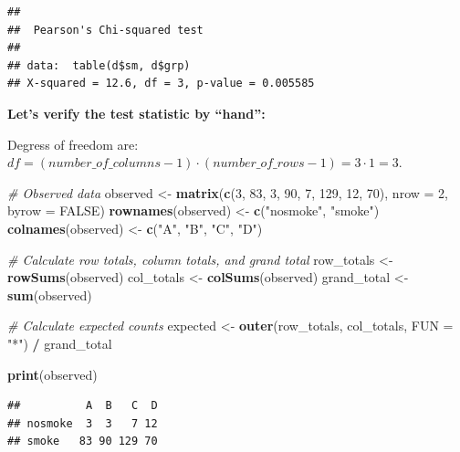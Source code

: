 \documentclass[
]{book}
\newenvironment{Shaded}{\begin{snugshade}}{\end{snugshade}}
\newcommand{\AttributeTok}[1]{\textcolor[rgb]{0.13,0.29,0.53}{#1}}
\newcommand{\CommentTok}[1]{\textcolor[rgb]{0.56,0.35,0.01}{\textit{#1}}}
\newcommand{\ConstantTok}[1]{\textcolor[rgb]{0.56,0.35,0.01}{#1}}
\newcommand{\DecValTok}[1]{\textcolor[rgb]{0.00,0.00,0.81}{#1}}
\newcommand{\FunctionTok}[1]{\textcolor[rgb]{0.13,0.29,0.53}{\textbf{#1}}}
\newcommand{\NormalTok}[1]{#1}
\newcommand{\OtherTok}[1]{\textcolor[rgb]{0.56,0.35,0.01}{#1}}
\newcommand{\SpecialCharTok}[1]{\textcolor[rgb]{0.81,0.36,0.00}{\textbf{#1}}}
\newcommand{\StringTok}[1]{\textcolor[rgb]{0.31,0.60,0.02}{#1}}
\begin{document}
\begin{verbatim}
## 
##  Pearson's Chi-squared test
## 
## data:  table(d$sm, d$grp)
## X-squared = 12.6, df = 3, p-value = 0.005585
\end{verbatim}

\textbf{Let's verify the test statistic by ``hand'':}

Degress of freedom are:
\(df = (number\_of\_columns - 1) \cdot (number\_of\_rows - 1) = 3 \cdot 1 = 3\).

\begin{Shaded}
\begin{Highlighting}[]
\CommentTok{\# Observed data}
\NormalTok{observed }\OtherTok{\textless{}{-}} \FunctionTok{matrix}\NormalTok{(}\FunctionTok{c}\NormalTok{(}\DecValTok{3}\NormalTok{, }\DecValTok{83}\NormalTok{, }\DecValTok{3}\NormalTok{, }\DecValTok{90}\NormalTok{, }\DecValTok{7}\NormalTok{, }\DecValTok{129}\NormalTok{, }\DecValTok{12}\NormalTok{, }\DecValTok{70}\NormalTok{), }\AttributeTok{nrow =} \DecValTok{2}\NormalTok{, }\AttributeTok{byrow =} \ConstantTok{FALSE}\NormalTok{)}
\FunctionTok{rownames}\NormalTok{(observed) }\OtherTok{\textless{}{-}} \FunctionTok{c}\NormalTok{(}\StringTok{"nosmoke"}\NormalTok{, }\StringTok{"smoke"}\NormalTok{)}
\FunctionTok{colnames}\NormalTok{(observed) }\OtherTok{\textless{}{-}} \FunctionTok{c}\NormalTok{(}\StringTok{"A"}\NormalTok{, }\StringTok{"B"}\NormalTok{, }\StringTok{"C"}\NormalTok{, }\StringTok{"D"}\NormalTok{)}

\CommentTok{\# Calculate row totals, column totals, and grand total}
\NormalTok{row\_totals }\OtherTok{\textless{}{-}} \FunctionTok{rowSums}\NormalTok{(observed)}
\NormalTok{col\_totals }\OtherTok{\textless{}{-}} \FunctionTok{colSums}\NormalTok{(observed)}
\NormalTok{grand\_total }\OtherTok{\textless{}{-}} \FunctionTok{sum}\NormalTok{(observed)}

\CommentTok{\# Calculate expected counts}
\NormalTok{expected }\OtherTok{\textless{}{-}} \FunctionTok{outer}\NormalTok{(row\_totals, col\_totals, }\AttributeTok{FUN =} \StringTok{"*"}\NormalTok{) }\SpecialCharTok{/}\NormalTok{ grand\_total}

\FunctionTok{print}\NormalTok{(observed)}
\end{Highlighting}
\end{Shaded}

\begin{verbatim}
##          A  B   C  D
## nosmoke  3  3   7 12
## smoke   83 90 129 70
\end{verbatim}
\end{document}
